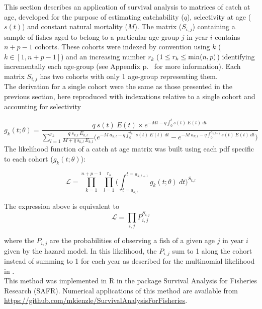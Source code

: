 This section describes an application of survival analysis to matrices of catch at age, developed for the purpose of estimating catchability ($q$), selectivity at age ($s(t)$) and constant natural mortality ($M$). The matrix ($S_{i,j}$) containing a sample of fishes aged to belong to a particular age-group $j$ in year $i$ contains $n+p-1$ cohorts. These cohorts were indexed by convention using $k$ ($k \in [1, n+p-1]$) and an increasing number $r_{k}$ ($ 1 \leq r_{k} \leq {\rm min}(n,p)$) identifying incrementally each age-group (see Appendix p.~\pageref{Appendix:DefinitionsOfMathematicalSymbols} for more information). Each matrix $S_{i,j}$ has two cohorts with only 1 age-group representing them.\\

The derivation for a single cohort were the same as those presented in the previous section, here reproduced with indexations relative to a single cohort and accounting for selectivity

\begin{equation}
g_{k}(t; \theta) = \frac{q \ s(t) \ E(t) \times e^{-Mt-q\int_{0}^{t} s(t) \ E(t) \ dt}}{\sum_{l=1}^{r_{k}} \frac{q \ s_{k,l} \ E_{k,l}}{M+q \ s_{k,l} \ E_{k,l}} \bigl ( e^{-M \ a_{k,l}-q\int_{0}^{a_{k,l}}s(t) \ E(t) \ dt} - e^{-M \ a_{k,l}-q\int_{0}^{a_{k,l+1}}s(t) \ E(t) \ dt} \bigr )} 
\end{equation}
\newline
The likelihood function of a catch at age matrix was built using each pdf specific to each cohort ($g_{k}(t; \theta)$):

\begin{equation}
\mathcal{L} = \prod_{k=1}^{n+p-1} \prod_{l=1}^{r_{k}}  \bigl ( \int_{t=a_{k,l}}^{t=a_{k,l+1}} g_{k}(t; \theta) \ dt \bigr ) ^ {S_{k,l}}
\end{equation}

The expression above is equivalent to 
\begin{equation}
\mathcal{L} = \prod_{i,j} P_{i,j} ^ {S_{i,j}}
\end{equation}

\noindent where the $P_{i,j}$ are the probabilities of observing a fish of a given age $j$ in year $i$ given by the hazard model. In this likelihood, the $P_{i,j}$ sum to 1 along the cohort instead of summing to 1 for each year as described for the multinomial likelihood in \cite{Four82a}. \\

This method was implemented in R \citep{R} in the package Survival Analysis for Fisheries Research (SAFR). Numerical applications of this method are available from \url{https://github.com/mkienzle/SurvivalAnalysisForFisheries}. %
